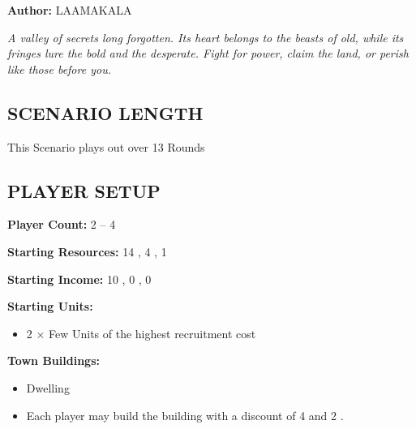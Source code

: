 
\begin{multicols*}{2}

\textbf{Author:} LAAMAKALA


\textit{A valley of secrets long forgotten. Its heart belongs to the beasts of old, while its fringes lure the bold and the desperate. Fight for power, claim the land, or perish like those before you.}


\subsection*{\MakeUppercase{Scenario Length}}
This Scenario plays out over 13 Rounds 

\subsection*{\MakeUppercase{Player Setup}}
\textbf{Player Count:} 2 -- 4

\textbf{Starting Resources:} 14 , 4 , 1 

\textbf{Starting Income:} 10 , 0 , 0 

\textbf{Starting Units:}
\begin{itemize}
  \item 2 × Few  Units of the highest recruitment cost
\end{itemize}

\textbf{Town Buildings:}
\begin{itemize}
  \item {} Dwelling
  \item Each player may build the  building with a discount of 4  and 2 . %
\end{itemize}


\end{multicols*}
